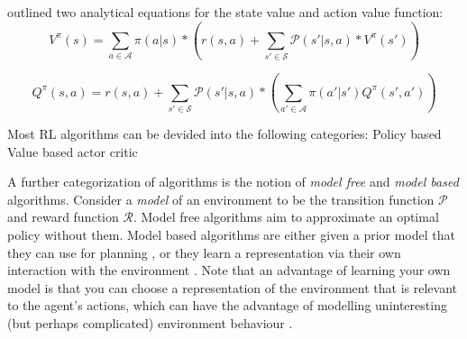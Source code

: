 \documentclass{../main.tex}{subfiles}
\begin{document}
\cite{Bellman1957} outlined two analytical equations for the state value and action value function:
\begin{equation}\label{equation:bellman:state-value-function}
V^{\pi}(s) = \sum_{a \in \mathcal{A}} \pi(a | s) * (r(s, a) + \sum_{s' \in \mathcal{S}} \mathcal{P}(s' | s, a) * V^{\pi}(s'))
\end{equation}

\begin{equation}\label{equation:bellman:action-value-function}
Q^{\pi}(s, a) = r(s, a) + \sum_{s' \in \mathcal{S}} \mathcal{P}(s' | s, a) * (\sum_{a' \in \mathcal{A}} \pi(a' | s') Q^{\pi}(s', a'))
\end{equation}


Most RL algorithms can be devided into the following categories:
Policy based
Value based
actor critic

A further categorization of algorithms is the notion of \textit{model free} and \textit{model based} algorithms. Consider a \textit{model} of an environment to be the transition function $\mathcal{P}$ and reward function $\mathcal{R}$. Model free algorithms aim to approximate an optimal policy without them. Model based algorithms are either given a prior model that they can use for planning \citep{browne2012survey, Soemers2014}, or they learn a representation via their own interaction with the environment \citep{Sutton1991, Guzdial2017}. Note that an advantage of learning your own model is that you can choose a representation of the environment that is relevant to the agent's actions, which can have the advantage of modelling uninteresting (but perhaps complicated) environment behaviour \citep{Pathak2017}.
\end{document}
